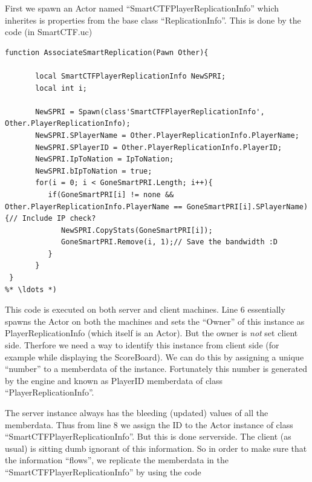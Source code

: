 \documentclass{article}
\begin{document}
First we spawn an {\color{Cyan}Actor} named ``SmartCTFPlayerReplicationInfo'' which inherites is properties from the base class ``ReplicationInfo''.  This is done by the code (in {\color{Orange}SmartCTF.uc})
\begin{lstlisting}[frame=single]
  function AssociateSmartReplication(Pawn Other){

       local SmartCTFPlayerReplicationInfo NewSPRI;
       local int i;

       NewSPRI = Spawn(class'SmartCTFPlayerReplicationInfo', Other.PlayerReplicationInfo);
       NewSPRI.SPlayerName = Other.PlayerReplicationInfo.PlayerName;
       NewSPRI.SPlayerID = Other.PlayerReplicationInfo.PlayerID;
       NewSPRI.IpToNation = IpToNation;
       NewSPRI.bIpToNation = true;
       for(i = 0; i < GoneSmartPRI.Length; i++){
          if(GoneSmartPRI[i] != none && Other.PlayerReplicationInfo.PlayerName == GoneSmartPRI[i].SPlayerName){// Include IP check?
             NewSPRI.CopyStats(GoneSmartPRI[i]);
             GoneSmartPRI.Remove(i, 1);// Save the bandwidth :D
          }
       }
 }
%* \ldots *) 
\end{lstlisting}
This code is executed on both server and client machines.  Line 6 essentially spawns the {\color{Cyan}Actor} on both the machines and sets the ``Owner'' of this instance as {\color{Cyan}PlayerReplicationInfo} (which itself is an {\color{Cyan}Actor}).  But the owner is \emph{not} set client side.  Therfore we need a way to identify this instance from client side (for example while displaying the ScoreBoard).  We can do this by assigning a unique ``number'' to a memberdata of the instance. Fortunately this number is generated by the engine and known as {\color{Magenta}PlayerID} memberdata of class ``PlayerReplicationInfo''. 

The server instance always has the bleeding (updated) values of all the  memberdata.  Thus from line 8 we assign the ID to the {\color{Cyan}Actor} instance of class ``SmartCTFPlayerReplicationInfo''.  But this is done serverside.  The client (as usual) is sitting dumb ignorant of this information.  So in order to make sure that the information ``flows'', we replicate the memberdata in the ``SmartCTFPlayerReplicationInfo'' by using the code
\end{document}
